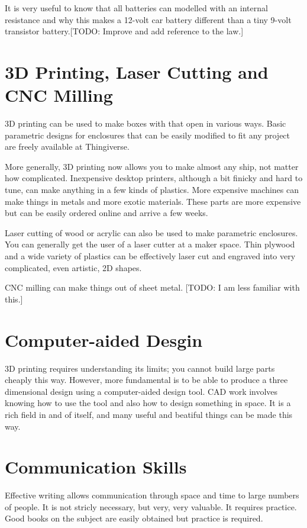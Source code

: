 \documentclass[
	fontsize=10pt, %
	twoside=false, %
	secnumdepth=1, %
]{kaobook}
\begin{document}
It is very useful to know that all batteries can modelled
with an internal resistance and why this makes a 12-volt car battery
different than a tiny 9-volt transistor battery.[TODO: Improve and add reference to the law.]

\section{3D Printing, Laser Cutting and CNC Milling}

3D printing can be used to make boxes with that open in various
ways. Basic parametric designs for enclosures that can be
easily modified to fit any project are freely available at
Thingiverse.

More generally, 3D printing now allows you to make almost
any ship, not matter how complicated. Inexpensive desktop
printers, although a bit finicky and hard to tune, can
make anything in a few kinds of plastics. More expensive
machines can make things in metals and more exotic materials.
These parts are more expensive but can be easily ordered
online and arrive a few weeks.

Laser cutting of wood or acrylic can also be used to make
parametric enclosures.
You can generally get the user of a laser cutter at a
maker space. Thin plywood and a wide variety of plastics
can be effectively laser cut and engraved into very complicated,
even artistic, 2D shapes.

CNC milling can make things out of sheet metal. [TODO:
  I am less familiar with this.]

\section{Computer-aided Desgin}

3D printing requires understanding its limits; you
cannot build large parts cheaply this way.
However, more fundamental is to be able to produce a
three dimensional design using a computer-aided design
tool.
CAD work involves knowing how to use the tool and also
how to design something in space.
It is a rich field in and of itself, and
many useful and beatiful things can be made this way.

\section{Communication Skills}

Effective writing allows communication through space and time to
large numbers of people. It is not stricly necessary, but very, very
valuable. It requires practice.
Good books on the subject are easily obtained but practice is required.
\end{document}
